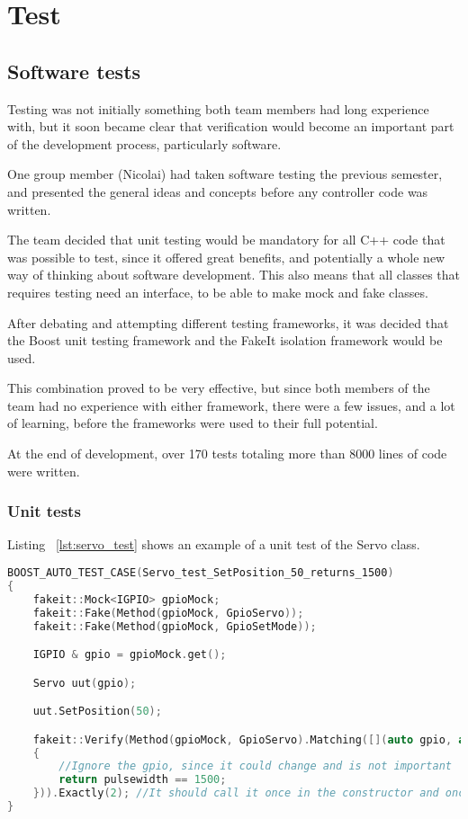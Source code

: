\chapter{Test}
\label{sec:test}
\section{Software tests}
Testing was not initially something both team members had long experience with, but it soon became clear that verification would become an important part of the development process, particularly software. 

One group member (Nicolai) had taken software testing the previous semester, and presented the general ideas and concepts before any controller code was written. 

The team decided that unit testing would be mandatory for all C++ code that was possible to test, since it offered great benefits, and potentially a whole new way of thinking about software development. This also means that all classes that requires testing need an interface, to be able to make mock and fake classes.

After debating and attempting different testing frameworks, it was decided that the Boost unit testing framework and the FakeIt isolation framework would be used. 

This combination proved to be very effective, but since both members of the team had no experience with either framework, there were a few issues, and a lot of learning, before the frameworks were used to their full potential.

At the end of development, over 170 tests totaling more than 8000 lines of code were written. 

\subsection{Unit tests}

Listing ~\ref{lst:servo_test} shows an example of a unit test of the Servo class.

\begin{lstlisting}[caption = {Servo test of SetPosition}, captionpos=b, label={lst:servo_test}, language=C++,firstnumber=1]
BOOST_AUTO_TEST_CASE(Servo_test_SetPosition_50_returns_1500)
{
	fakeit::Mock<IGPIO> gpioMock;
	fakeit::Fake(Method(gpioMock, GpioServo));
	fakeit::Fake(Method(gpioMock, GpioSetMode));

	IGPIO & gpio = gpioMock.get();

	Servo uut(gpio);

	uut.SetPosition(50);

	fakeit::Verify(Method(gpioMock, GpioServo).Matching([](auto gpio, auto pulsewidth)
	{
		//Ignore the gpio, since it could change and is not important
		return pulsewidth == 1500;
	})).Exactly(2); //It should call it once in the constructor and once again when we set it.
}
\end{lstlisting}

